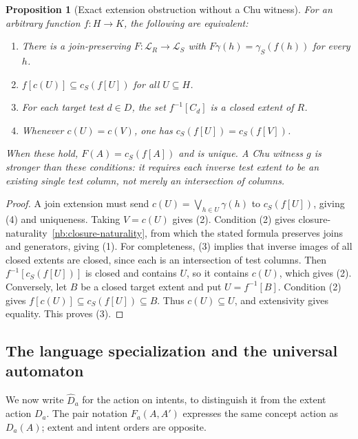 \documentclass[11pt]{article}
\newtheorem{proposition}[theorem]{Proposition}
\theoremstyle{remark}
\begin{document}
\begin{proposition}[Exact extension obstruction without a Chu witness]
\label{nb:extension-test}
For an arbitrary function $f:H\to K$, the following are equivalent:
\begin{enumerate}
\item There is a join-preserving $F:\mathcal L_R\to\mathcal L_S$ with
$F\gamma(h)=\gamma_S(f(h))$ for every $h$.
\item $f[c(U)]\subseteq c_S(f[U])$ for all $U\subseteq H$.
\item For each target test $d\in D$, the set $f^{-1}[C_d]$ is a closed
extent of $R$.
\item Whenever $c(U)=c(V)$, one has $c_S(f[U])=c_S(f[V])$.
\end{enumerate}
When these hold, $F(A)=c_S(f[A])$ and is unique. A Chu witness $g$
is stronger than these conditions: it requires each inverse test extent
to be an \emph{existing single test column}, not merely an intersection
of columns.
\end{proposition}
\begin{proof}
A join extension must send
$c(U)=\bigvee_{h\in U}\gamma(h)$ to $c_S(f[U])$, giving (4) and
uniqueness. Taking $V=c(U)$ gives (2). Condition (2) gives
closure-naturality~\eqref{nb:closure-naturality}, from which the stated
formula preserves joins and generators, giving (1).
For completeness, (3) implies that inverse images of all closed extents
are closed, since each is an intersection of test columns. Then
$f^{-1}[c_S(f[U])]$ is closed and contains $U$, so it contains $c(U)$,
which gives (2). Conversely, let $B$ be a closed target extent and put
$U=f^{-1}[B]$. Condition (2) gives
$f[c(U)]\subseteq c_S(f[U])\subseteq B$. Thus $c(U)\subseteq U$,
and extensivity gives equality. This proves (3).
\end{proof}

\subsection{The language specialization and the universal automaton}
We now write $\widehat D_a$ for the action on intents, to distinguish it
from the extent action $D_a$. The pair notation $F_a(A,A')$ expresses the
same concept action as $D_a(A)$; extent and intent orders are opposite.
\end{document}
